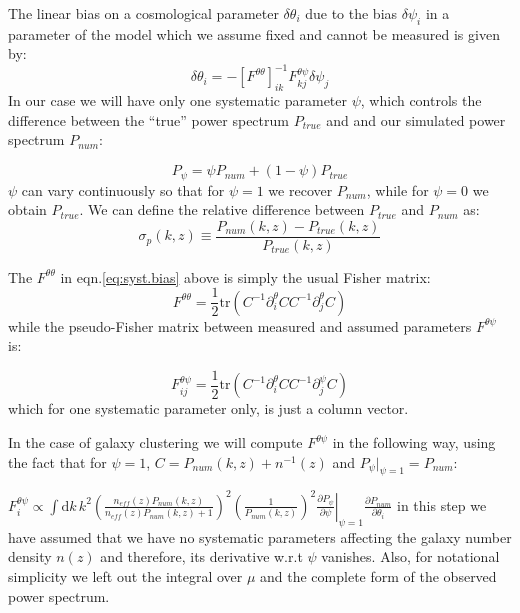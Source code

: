 The linear bias on a cosmological parameter $\delta\theta_{i}$ due
to the bias $\delta\psi_{i}$ in a parameter of the model which we
assume fixed and cannot be measured is given by: 
\begin{equation}
\delta\theta_{i}=-\left[F^{\theta\theta}\right]_{ik}^{-1}F_{kj}^{\theta\psi}\delta\psi_{j}\label{eq:syst.bias}
\end{equation}
In our case we will have only one systematic parameter $\psi$, which
controls the difference between the ``true'' power spectrum $P_{true}$
and and our simulated power spectrum $P_{num}$:

\[
P_{\psi}=\psi P_{num}+(1-\psi)P_{true}
\]
$\psi$ can vary continuously so that for $\psi=1$ we recover $P_{num}$,
while for $\psi=0$ we obtain $P_{true}$. We can define 
the relative difference between $P_{true}$ and $P_{num}$ as:
\begin{equation}
\sigma_{p}(k,z)\equiv\frac{P_{num}(k,z)-P_{true}(k,z)}{P_{true}(k,z)}
\end{equation}


The $F^{\theta\theta}$ in eqn.\ref{eq:syst.bias} above is simply
the usual Fisher matrix: 
\[
F^{\theta\theta}=\frac{1}{2}\mbox{tr}\left(C^{-1}\partial_{i}^{\theta}CC^{-1}\partial_{j}^{\theta}C\right)
\]
while the pseudo-Fisher matrix between measured and assumed parameters
$F^{\theta\psi}$ is:

\begin{equation}
F_{ij}^{\theta\psi}=\frac{1}{2}\mbox{tr}\left(C^{-1}\partial_{i}^{\theta}CC^{-1}\partial_{j}^{\psi}C\right)
\end{equation}
which for one systematic parameter only, is just a column vector.

In the case of galaxy clustering we will compute $F^{\theta\psi}$
in the following way, using the fact that for $\psi=1$, $C=P_{num}(k,z)+n^{-1}(z)$
and $P_{\psi}|_{\psi=1}=P_{num}$:

\beeq$ \label{eq:pseudo-Fisher}
F_{i}^{\theta\psi}\propto\int\mbox{d}k\, k^{2}\left(\frac{n_{eff}(z)P_{num}(k,z)}{n_{eff}(z)P_{num}(k,z)+1}\right)^{2}\left(\frac{1}{P_{num}(k,z)}\right)^{2}\left.\frac{\partial P_{\psi}}{\partial\psi}\right|_{\psi=1}\frac{\partial P_{num}}{\partial\theta_{i}}
$
in this step we have assumed that we have no systematic parameters
affecting the galaxy number density $n(z)$ and therefore, its derivative
w.r.t $\psi$ vanishes. Also, for notational simplicity we left out the integral over $\mu$ and the complete
form of the observed power spectrum.

